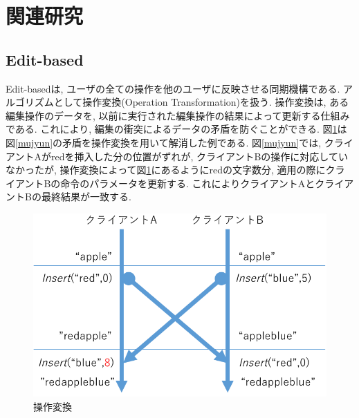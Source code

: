 \section{関連研究}
%
\subsection{Edit-based}
Edit-basedは, ユーザの全ての操作を他のユーザに反映させる同期機構である.
アルゴリズムとして操作変換(Operation Transformation)\cite{OT}を扱う.
操作変換は, ある編集操作のデータを, 以前に実行された編集操作の結果によって更新する仕組みである.
これにより, 編集の衝突によるデータの矛盾を防ぐことができる.
図\ref{ot}は図\ref{mujyun}の矛盾を操作変換を用いて解消した例である. 図\ref{mujyun}では, クライアントAがredを挿入した分の位置がずれが, クライアントBの操作に対応していなかったが, 操作変換によって図\ref{ot}にあるようにredの文字数分, 適用の際にクライアントBの命令のパラメータを更新する. これによりクライアントAとクライアントBの最終結果が一致する.
\begin{figure}[htbp]
  \begin{center}
    \includegraphics[scale=0.5]{images/ot}
    \caption{操作変換}
    \label{ot}
  \end{center}
\end{figure}
%

